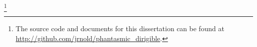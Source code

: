 
\footnote{The source code and documents for this dissertation can be found at \url{http://github.com/jrnold/phantasmic_dirigible}.}

